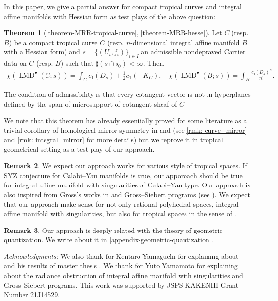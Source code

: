 \documentclass[a4paper,dvipdfmx,reqno,12pt]{amsart}
\theoremstyle{definition}
\newtheorem{theorem}{Theorem}[section]
\newtheorem{remark}[theorem]{Remark}
\newcommand{\opn}[1]{\operatorname{#1}}
\numberwithin{equation}{section}
\begin{document}
In this paper, we give a partial answer for compact tropical curves 
and integral affine manifolds with Hessian form
as test plays of the above question:

\begin{theorem}[{\cref{theorem-MRR-tropical-curve},
\cref{theorem-MRR-hesse}}] \label{thm: main}
Let $C$ (resp. $B$) be a compact tropical curve $C$ 
(resp. $n$-dimensional integral 
affine manifold $B$
with a Hessian form) and $s=\{(U_i,f_i)\}_{i\in I}$ an 
admissible nondepraved
Cartier data on $C$ (resp. $B$) such that 
$\sharp(s\cap s_0)<\infty$. Then,
\begin{align}
\chi(\opn{LMD}^{\bullet}(C;s))=\int_C c_1(D_s)+\frac{1}{2}c_1(-K_C), \quad 
\chi(\opn{LMD}^{\bullet}(B;s))=\int_B \frac{c_1(D_s)^{n}}{n!}.
\end{align}
\end{theorem}

The condition of admissibility is that every cotangent vector 
is not in hyperplanes defined by the span of microsupport of
cotangent sheaf of $C$. 


We note that this theorem has already essentially proved for some
literature as a trivial corollary of homological mirror symmetry 
in \cite{MR4301560} and \cite{auroux2022lagrangian} (see \cref{rmk: curve_mirror} and \cref{rmk: integral_mirror} 
for more details) but we reprove it in tropical  
geometrical setting as a test play of our approach.

\begin{remark}
We expect our approach works for various style 
of tropical spaces. 
If SYZ conjecture for Calabi--Yau manifolds
is true, our apporoach should
be true for integral affine manifold 
with singularities of Calabi--Yau type.
Our approach is 
also inspired from Gross's 
works in 
\cite{grossSpecialLagrangianFibrations1998a} and Gross--Siebert programs
(see \cite[Conjecture 1.6]{MR3525095}).
We expect that 
our approach make sense for not only rational polyhedral
spaces, integral affine manifold with singularities,
but also for tropical spaces 
in the sense of \cite[Definition 2.8]{cavalieri2020tropical}.

\end{remark}

\begin{remark}
Our approach is deeply related with the theory of
geometric quantization. We write about it in 
\cref{appendix-geometric-quantization}.
\end{remark}

\textit{Acknowledgments:}
We also thank for Kentaro Yamaguchi for explaining about
\cite{MR4234675} and his results of master thesis 
\cite{yamaguchimaster}. We thank for Yuto Yamamoto for
explaining about the radiance obstruction of integral 
affine manifold with singularities and Gross--Siebert
programs.
This work was supported by JSPS KAKENHI 
Grant Number 21J14529.
\end{document}
